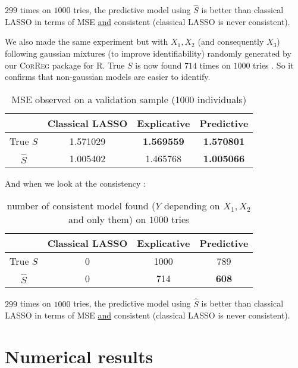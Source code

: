\documentclass[11pt,a4paper]{report}
\begin{document}
		$299$ times on $1000$ tries, the predictive model using $\hat{S}$ is better than classical LASSO in terms of MSE \underline{and} consistent (classical LASSO is never consistent).
		
		We also made the same experiment but with $X_1,X_2$ (and consequently $X_3$) following gaussian mixtures (to improve identifiability) randomly generated by our \textsc{CorReg} package for R. 
		True $S$ is now found $714$ times on $1000$ tries \label{testidentifiable}. So it confirms that non-gaussian models are easier to identify.
		
		
		\begin{table}[h!]
		\centering
		\begin{tabular}{|c|c|c|c|}
		\hline 
		 & Classical LASSO & Explicative & Predictive \\ 
		\hline 
		True $S$ &  1.571029 & \textbf{1.569559} & \textbf{1.570801} \\ 
		\hline 
		$\hat{S}$ & 1.005402 & 1.465768 & \textbf{1.005066} \\ 
		\hline 
		\end{tabular} 
		\caption{MSE observed on a validation sample (1000 individuals)}
		\end{table}

		And when we look at the consistency :
		\begin{table}[h!]
		\centering	
		\begin{tabular}{|c|c|c|c|}
		\hline 
		 & Classical LASSO & Explicative & Predictive \\ 
		\hline 
		True $S$ &  0 & 1000 & 789 \\ 
		\hline 
		$\hat{S}$ & 0 & 714 & \textbf{608} \\ 
		\hline 
		\end{tabular} 
		\caption{number of consistent model found ($Y$ depending on $X_1,X_2$ and only them) on $1000$ tries}
		\end{table}				
				
		
		$299$ times on $1000$ tries, the predictive model using $\hat{S}$ is better than classical LASSO in terms of MSE \underline{and} consistent (classical LASSO is never consistent).
		

	\section{Numerical results}
\end{document}
